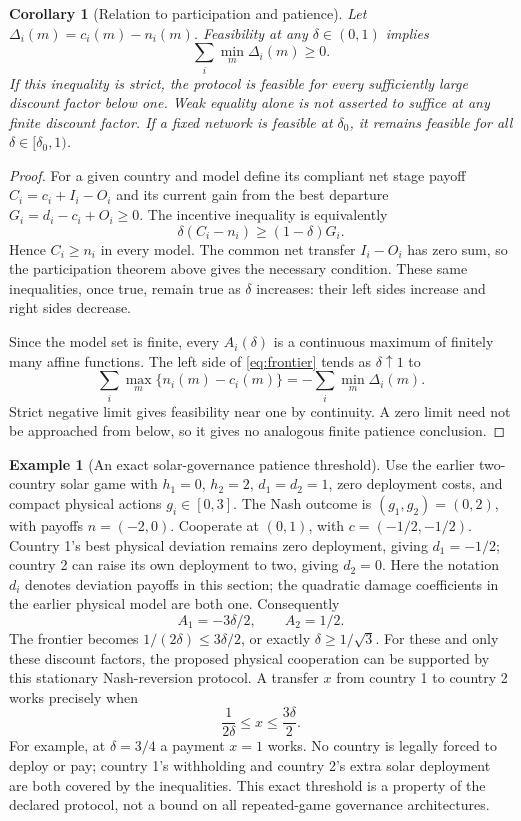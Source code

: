 \documentclass[11pt]{article}
\newtheorem{corollary}{Corollary}
\theoremstyle{definition}
\newtheorem{example}{Example}
\begin{document}
\begin{corollary}[Relation to participation and patience]
Let $\Delta_i(m)=c_i(m)-n_i(m)$. Feasibility at any
$\delta\in(0,1)$ implies
\[
 \sum_i\min_m\Delta_i(m)\geq0.
\]
If this inequality is strict, the protocol is feasible for every
sufficiently large discount factor below one. Weak equality alone is not
asserted to suffice at any finite discount factor. If a fixed network is
feasible at $\delta_0$, it remains feasible for all
$\delta\in[\delta_0,1)$.
\end{corollary}
\begin{proof}
For a given country and model define its compliant net stage payoff
$C_i=c_i+I_i-O_i$ and its current gain from the best departure
$G_i=d_i-c_i+O_i\geq0$. The incentive inequality is equivalently
\[
 \delta(C_i-n_i)\geq(1-\delta)G_i.
\]
Hence $C_i\geq n_i$ in every model. The common net transfer
$I_i-O_i$ has zero sum, so the participation theorem above gives the
necessary condition. These same inequalities, once true, remain true as
$\delta$ increases: their left sides increase and right sides decrease.

Since the model set is finite, every $A_i(\delta)$ is a continuous
maximum of finitely many affine functions. The left side of
\eqref{eq:frontier} tends as $\delta\uparrow1$ to
\[
 \sum_i\max_m\{n_i(m)-c_i(m)\}
       =-\sum_i\min_m\Delta_i(m).
\]
Strict negative limit gives feasibility near one by continuity. A zero
limit need not be approached from below, so it gives no analogous finite
patience conclusion.
\end{proof}

\begin{example}[An exact solar-governance patience threshold]
Use the earlier two-country solar game with $h_1=0$, $h_2=2$,
$d_1=d_2=1$, zero deployment costs, and compact physical actions
$g_i\in[0,3]$. The Nash outcome is $(g_1,g_2)=(0,2)$, with payoffs
$n=(-2,0)$. Cooperate at $(0,1)$, with $c=(-1/2,-1/2)$.
Country 1's best physical deviation remains zero deployment, giving
$d_1=-1/2$; country 2 can raise its own deployment to two, giving $d_2=0$.
Here the notation $d_i$ denotes deviation payoffs in this section; the
quadratic damage coefficients in the earlier physical model are both one.
Consequently
\[
 A_1=-3\delta/2,\qquad A_2=1/2.
\]
The frontier becomes $1/(2\delta)\leq3\delta/2$, or exactly
$\delta\geq1/\sqrt3$. For these and only these discount factors, the
proposed physical cooperation can be supported by this stationary
Nash-reversion protocol. A transfer $x$ from country 1 to country 2 works
precisely when
\[
 \frac1{2\delta}\leq x\leq\frac{3\delta}{2}.
\]
For example, at $\delta=3/4$ a payment $x=1$ works. No country is legally
forced to deploy or pay; country 1's withholding and country 2's extra
solar deployment are both covered by the inequalities. This exact threshold
is a property of the declared protocol, not a bound on all repeated-game
governance architectures.
\end{example}
\end{document}
